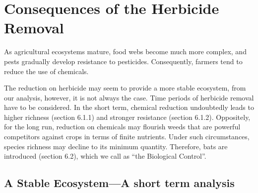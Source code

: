 \documentclass[12pt]{article}
\begin{document}
\section{Consequences of the Herbicide Removal}
\hspace{1.5em}As agricultural ecosystems mature, food webs become much more complex, and pests gradually develop resistance to pesticides. Consequently, farmers tend to reduce the use of chemicals. 
	
The reduction on herbicide may seem to provide a more stable ecosystem, from our analysis, however, it is not always the case. Time periods of herbicide removal have to be considered. In the short term, chemical reduction undoubtedly leads to higher richness (section 6.1.1) and stronger resistance (section 6.1.2). Oppositely, for the long run, reduction on chemicals may flourish weeds that are powerful competitors against crops in terms of finite nutrients. Under such circumstances, species richness may decline to its minimum quantity. Therefore, bats are introduced (section 6.2), which we call as ``the Biological Control''.
	\subsection{A Stable Ecosystem---A short term analysis}
\end{document}
